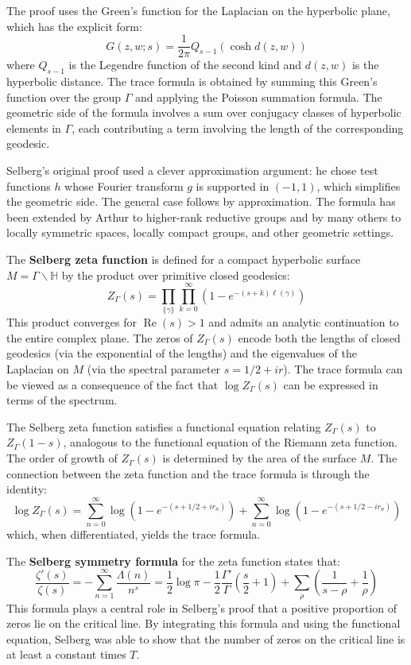 The proof uses the Green's function for the Laplacian on the hyperbolic plane, which has the explicit form:
\[G(z, w; s) = \frac{1}{2\pi} Q_{s-1}\left(\cosh d(z, w)\right)\]
where $Q_{s-1}$ is the Legendre function of the second kind and $d(z, w)$ is the hyperbolic distance. The trace formula is obtained by summing this Green's function over the group $\Gamma$ and applying the Poisson summation formula. The geometric side of the formula involves a sum over conjugacy classes of hyperbolic elements in $\Gamma$, each contributing a term involving the length of the corresponding geodesic.

Selberg's original proof used a clever approximation argument: he chose test functions $h$ whose Fourier transform $g$ is supported in $(-1, 1)$, which simplifies the geometric side. The general case follows by approximation. The formula has been extended by Arthur to higher-rank reductive groups and by many others to locally symmetric spaces, locally compact groups, and other geometric settings.

The \textbf{Selberg zeta function} is defined for a compact hyperbolic surface $M = \Gamma \backslash \mathbb{H}$ by the product over primitive closed geodesics:
\[Z_\Gamma(s) = \prod_{\{\gamma\}} \prod_{k=0}^\infty \left(1 - e^{-(s+k)\ell(\gamma)}\right)\]
This product converges for $\operatorname{Re}(s) > 1$ and admits an analytic continuation to the entire complex plane. The zeros of $Z_\Gamma(s)$ encode both the lengths of closed geodesics (via the exponential of the lengths) and the eigenvalues of the Laplacian on $M$ (via the spectral parameter $s = 1/2 + ir$). The trace formula can be viewed as a consequence of the fact that $\log Z_\Gamma(s)$ can be expressed in terms of the spectrum.

The Selberg zeta function satisfies a functional equation relating $Z_\Gamma(s)$ to $Z_\Gamma(1-s)$, analogous to the functional equation of the Riemann zeta function. The order of growth of $Z_\Gamma(s)$ is determined by the area of the surface $M$. The connection between the zeta function and the trace formula is through the identity:
\[\log Z_\Gamma(s) = \sum_{n=0}^\infty \log\left(1 - e^{-(s+1/2+ir_n)}\right) + \sum_{n=0}^\infty \log\left(1 - e^{-(s+1/2-ir_n)}\right)\]
which, when differentiated, yields the trace formula.

The \textbf{Selberg symmetry formula} for the zeta function states that:
\[\frac{\zeta'(s)}{\zeta(s)} = -\sum_{n=1}^\infty \frac{\Lambda(n)}{n^s} = \frac{1}{2} \log \pi - \frac{1}{2} \frac{\Gamma'}{\Gamma}\left(\frac{s}{2}+1\right) + \sum_\rho \left(\frac{1}{s-\rho} + \frac{1}{\rho}\right)\]
This formula plays a central role in Selberg's proof that a positive proportion of zeros lie on the critical line. By integrating this formula and using the functional equation, Selberg was able to show that the number of zeros on the critical line is at least a constant times $T$.

